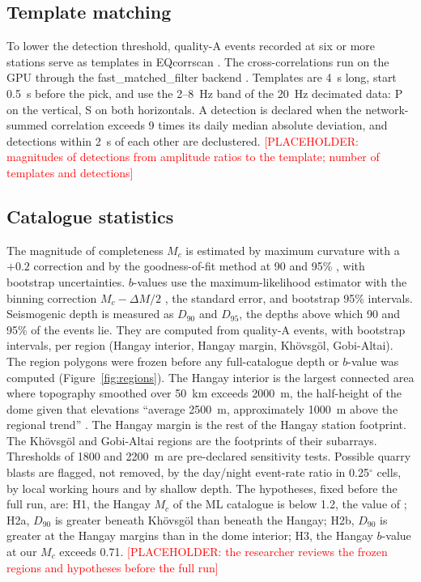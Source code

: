 \documentclass[11pt]{article}
\newcommand{\placeholder}[1]{\textcolor{red}{[PLACEHOLDER: #1]}}
\begin{document}
\subsection{Template matching}
To lower the detection threshold, quality-A events recorded at six or more stations serve as templates in EQcorrscan \citep{chamberlain2018}. The cross-correlations run on the GPU through the fast\_matched\_filter backend \citep{beauce2018}. Templates are 4~s long, start 0.5~s before the pick, and use the 2--8~Hz band of the 20~Hz decimated data: P on the vertical, S on both horizontals. A detection is declared when the network-summed correlation exceeds 9 times its daily median absolute deviation, and detections within 2~s of each other are declustered. \placeholder{magnitudes of detections from amplitude ratios to the template; number of templates and detections}

\subsection{Catalogue statistics}
\label{sec:hypotheses}
The magnitude of completeness $M_c$ is estimated by maximum curvature with a $+0.2$ correction \citep{woessner2005} and by the goodness-of-fit method at 90 and 95\% \citep{wiemer2000}, with bootstrap uncertainties. $b$-values use the maximum-likelihood estimator \citep{aki1965} with the binning correction $M_c - \Delta M/2$ \citep{utsu1966}, the \citet{shi1982} standard error, and bootstrap 95\% intervals. Seismogenic depth is measured as $D_{90}$ and $D_{95}$, the depths above which 90 and 95\% of the events lie. They are computed from quality-A events, with bootstrap intervals, per region (Hangay interior, Hangay margin, Khövsgöl, Gobi-Altai). The region polygons were frozen before any full-catalogue depth or $b$-value was computed (Figure~\ref{fig:regions}). The Hangay interior is the largest connected area where topography smoothed over 50~km exceeds 2000~m, the half-height of the dome given that elevations ``average 2500~m, approximately 1000~m above the regional trend'' \citep{meltzer2019}. The Hangay margin is the rest of the Hangay station footprint. The Khövsgöl and Gobi-Altai regions are the footprints of their subarrays. Thresholds of 1800 and 2200~m are pre-declared sensitivity tests. Possible quarry blasts are flagged, not removed, by the day/night event-rate ratio in 0.25$^\circ$ cells, by local working hours and by shallow depth. The hypotheses, fixed before the full run, are:
H1, the Hangay $M_c$ of the ML catalogue is below 1.2, the value of \citet{meltzer2019};
H2a, $D_{90}$ is greater beneath Khövsgöl than beneath the Hangay;
H2b, $D_{90}$ is greater at the Hangay margins than in the dome interior;
H3, the Hangay $b$-value at our $M_c$ exceeds 0.71.
\placeholder{the researcher reviews the frozen regions and hypotheses before the full run}
\end{document}
